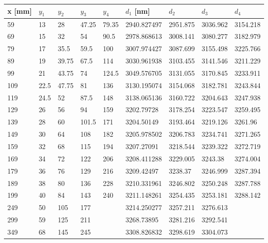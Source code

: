 \documentclass[czech,11pt,a4paper]{article}
\begin{document}
		\begin{center}
				\begin{tabular}{l|llll|llll}
			x [mm]   & $y_1$   & $y_2$    & $y_3$    & $y_4$    & $d_1$ [nm]          & $d_2$       & $d_3$       & $d_4$       \\ \hline
			59  & 13   & 28    & 47.25 & 79.35 & 2940.827497 & 2951.875 & 3036.962 & 3154.218 \\
			69  & 15   & 32    & 54    & 90.5  & 2978.868613 & 3008.141 & 3080.277 & 3182.979 \\
			79  & 17   & 35.5  & 59.5  & 100   & 3007.974427 & 3087.699 & 3155.498 & 3225.766 \\
			89  & 19   & 39.75 & 67.5  & 114   & 3030.961938 & 3103.455 & 3141.546 & 3211.229 \\
			99  & 21   & 43.75 & 74    & 124.5 & 3049.576705 & 3131.055 & 3170.845 & 3233.911 \\
			109 & 22.5 & 47.75 & 81    & 136   & 3130.195074 & 3154.068 & 3182.781 & 3243.844 \\
			119 & 24.5 & 52    & 87.5  & 148   & 3138.065136 & 3160.722 & 3204.643 & 3247.938 \\
			129 & 26   & 56    & 94    & 159   & 3202.79728  & 3178.254 & 3223.547 & 3259.495 \\
			139 & 28   & 60    & 101.5 & 171   & 3204.50149  & 3193.464 & 3219.126 & 3261.96  \\
			149 & 30   & 64    & 108   & 182   & 3205.978502 & 3206.783 & 3234.741 & 3271.265 \\
			159 & 32   & 68    & 115   & 194   & 3207.27091  & 3218.544 & 3239.322 & 3272.719 \\
			169 & 34   & 72    & 122   & 206   & 3208.411288 & 3229.005 & 3243.38  & 3274.004 \\
			179 & 36   & 76    & 129   & 216   & 3209.42497  & 3238.37  & 3246.999 & 3287.394 \\
			189 & 38   & 80    & 136   & 228   & 3210.331961 & 3246.802 & 3250.248 & 3287.788 \\
			199 & 40   & 84    & 143   & 240   & 3211.148261 & 3254.435 & 3253.181 & 3288.142 \\
			249 & 50   & 105   & 177   &       & 3214.250277 & 3257.211 & 3276.613 &          \\
			299 & 59   & 125   & 211   &       & 3268.73895  & 3281.216 & 3292.541 &          \\
			349 & 68   & 145   & 245   &       & 3308.826832 & 3298.619 & 3304.073 &          \\

\end{tabular}
\end{center}
\end{document}
